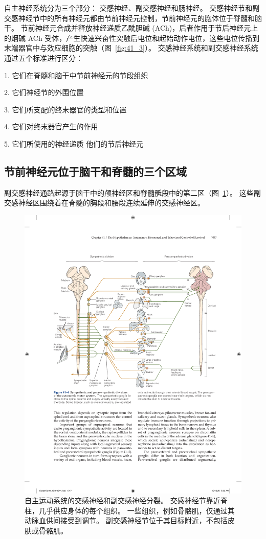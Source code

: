 自主神经系统分为三个部分：
交感神经、副交感神经和肠神经。
交感神经节和副交感神经节中的所有神经元都由节前神经元控制，节前神经元的胞体位于脊髓和脑干。
节前神经元合成并释放神经递质乙酰胆碱 (ACh)，后者作用于节后神经元上的烟碱 ACh 受体，产生快速兴奋性突触后电位和起始动作电位，这些电位传播到末端器官中与效应细胞的突触（图~\ref{fig:41_3}）。 
交感神经系统和副交感神经系统通过五个标准进行区分：

1. 它们在脊髓和脑干中节前神经元的节段组织 

2. 它们神经节的外围位置 

3. 它们所支配的终末器官的类型和位置 

4. 它们对终末器官产生的作用 

5. 它们所使用的神经递质 他们的节后神经元



\subsection{节前神经元位于脑干和脊髓的三个区域}

副交感神经通路起源于脑干中的颅神经区和脊髓骶段中的第二区（图~\ref{fig:41_4}）。
这些副交感神经区围绕着在脊髓的胸段和腰段连续延伸的交感神经区。


\begin{figure}[htbp]
	\centering
	\includegraphics[width=0.95\linewidth]{chap41/fig_41_4}
	\caption{自主运动系统的交感神经和副交感神经分裂。 交感神经节靠近脊柱，几乎供应身体的每个组织。 一些组织，例如骨骼肌，仅通过其动脉血供间接受到调节。 副交感神经节位于其目标附近，不包括皮肤或骨骼肌。}
	\label{fig:41_4}
\end{figure}


